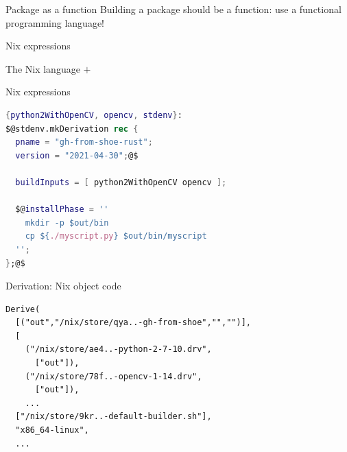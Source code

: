 \documentclass[aspectratio=169]{beamer}
\newcommand{\couleur}[2]{{\color{#1}{#2}}}
\begin{document}
\begin{frame}{Package as a function}
   Building a package should be a \couleur{blue-portage}{pure} function:
   use a functional programming language!
\end{frame}

\begin{frame}{Nix expressions}
\begin{block}{The Nix language}
    \couleur{blue-portage}{JSON} $+$
    \couleur{pink-froly}{$\lambda$ (higher-order functions)}
\end{block}
\end{frame}

\begin{frame}[fragile]{Nix expressions}
\begin{lstlisting}[language=Nix,title={gh-from-shoe/default.nix}]
{python2WithOpenCV, opencv, stdenv}:
$@stdenv.mkDerivation rec {
  pname = "gh-from-shoe-rust";
  version = "2021-04-30";@$

  buildInputs = [ python2WithOpenCV opencv ];

  $@installPhase = ''
    mkdir -p $out/bin
    cp ${./myscript.py} $out/bin/myscript
  '';
};@$
\end{lstlisting}
\end{frame}

\begin{frame}[fragile]{Derivation: Nix object code}
\begin{lstlisting}[title={/nix/store/27az7...gh-from-shoe-1-0.drv}]
Derive(
  [("out","/nix/store/qya..-gh-from-shoe","","")],
  [
    ("/nix/store/ae4..-python-2-7-10.drv",
      ["out"]),
    ("/nix/store/78f..-opencv-1-14.drv",
      ["out"]),
    ...
  ["/nix/store/9kr..-default-builder.sh"],
  "x86_64-linux",
  ...
\end{lstlisting}
\end{frame}
\end{document}
